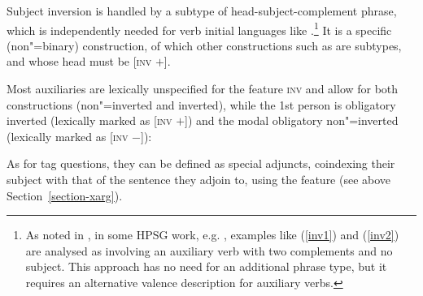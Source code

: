 Subject inversion is handled by a subtype of head-subject-complement phrase, which is independently
needed for verb initial languages like  \parencites[\iaddpages]{Borsley99c-u}[\iaddpages]{SWB2003a}.\footnote{As
  noted in \crossrefchapterw[\page \pageref{page-properties:aux-inversion}]{properties}, in some HPSG work, e.g. ,
  examples like (\ref{inv1}) and (\ref{inv2}) are analysed as involving an auxiliary verb with two
  complements and no subject. This approach has no need for an additional phrase type, but it
  requires an alternative valence description for auxiliary verbs.} It is a specific (non"=binary)
construction, of which other constructions such as  are subtypes,
and whose head must be [\textsc{inv} $+$].
\ea
{} \impl\\
\z
       
Most auxiliaries are lexically unspecified for the feature \textsc{inv} and allow for both constructions
(non"=inverted and inverted), while the 1st person  is obligatory inverted (lexically
marked as [\textsc{inv} $+$]) and the modal  obligatory non"=inverted (lexically marked
as [\textsc{inv} $-$]):

\eal
{}
\zl

As for tag questions, they can be defined as special adjuncts, coindexing their subject with that of the sentence they adjoin to, using the \xarg feature (see above Section~\ref{section-xarg}).
\ea
{} \impl\\
\z


